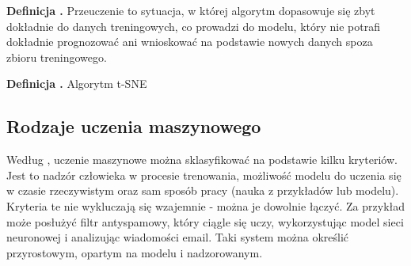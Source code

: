 \noindent
\textbf{Definicja \mlDefinitionIndex.}
\incrementMlDefinitionIndex
Przeuczenie to sytuacja, w której algorytm dopasowuje się zbyt dokładnie do danych treningowych,
co prowadzi do modelu, który nie potrafi dokładnie prognozować ani wnioskować na podstawie nowych danych spoza zbioru treningowego. 

\noindent
\textbf{Definicja \mlDefinitionIndex.}
\incrementMlDefinitionIndex
Algorytm t-SNE

\subsection{Rodzaje uczenia maszynowego}
Według \cite{Geron2020}, uczenie maszynowe można sklasyfikować na podstawie kilku kryteriów.
Jest to nadzór człowieka w procesie trenowania, możliwość modelu do uczenia się w czasie rzeczywistym
oraz sam sposób pracy (nauka z przykładów lub modelu). Kryteria te nie wykluczają się wzajemnie - można je dowolnie łączyć.
Za przykład może posłużyć filtr antyspamowy, który ciągle się uczy,
wykorzystując model sieci neuronowej i analizując wiadomości email.
Taki system można określić przyrostowym, opartym na modelu i nadzorowanym.

